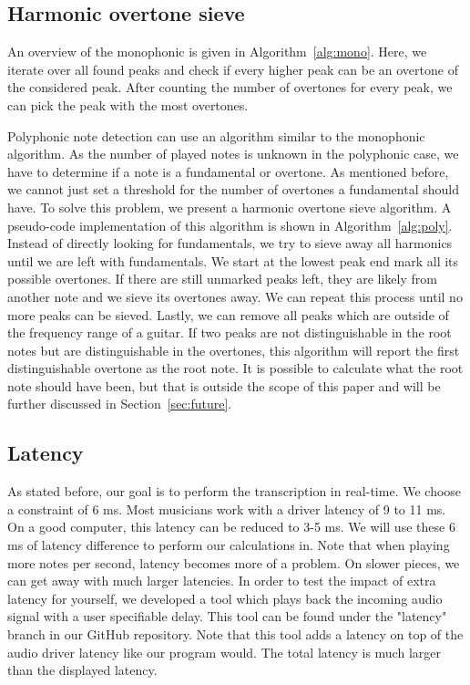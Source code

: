 \documentclass[10pt,twocolumn]{article}
\begin{document}
\subsection{Harmonic overtone sieve}  \label{sub:impnoteset}
An overview of the monophonic is given in Algorithm~\ref{alg:mono}. Here, we iterate over all found peaks and check if every higher peak can be an overtone of the considered peak. After counting the number of overtones for every peak, we can pick the peak with the most overtones.


Polyphonic note detection can use an algorithm similar to the monophonic algorithm. As the number of played notes is unknown in the polyphonic case, we have to determine if a note is a fundamental or overtone. As mentioned before, we cannot just set a threshold for the number of overtones a fundamental should have. To solve this problem, we present a harmonic overtone sieve algorithm. A pseudo-code implementation of this algorithm is shown in Algorithm~\ref{alg:poly}. Instead of directly looking for fundamentals, we try to sieve away all harmonics until we are left with fundamentals. We start at the lowest peak end mark all its possible overtones. If there are still unmarked peaks left, they are likely from another note and we sieve its overtones away. We can repeat this process until no more peaks can be sieved. Lastly, we can remove all peaks which are outside of the frequency range of a guitar. If two peaks are not distinguishable in the root notes but are distinguishable in the overtones, this algorithm will report the first distinguishable overtone as the root note. It is possible to calculate what the root note should have been, but that is outside the scope of this paper and will be further discussed in Section~\ref{sec:future}.


\subsection{Latency}
As stated before, our goal is to perform the transcription in real-time. We choose a constraint of 6 ms. Most musicians work with a driver latency of 9 to 11 ms. On a good computer, this latency can be reduced to 3-5 ms. We will use these 6 ms of latency difference to perform our calculations in. Note that when playing more notes per second, latency becomes more of a problem. On slower pieces, we can get away with much larger latencies. In order to test the impact of extra latency for yourself, we developed a tool which plays back the incoming audio signal with a user specifiable delay. This tool can be found under the "latency" branch in our GitHub repository. Note that this tool adds a latency on top of the audio driver latency like our program would. The total latency is much larger than the displayed latency.
\end{document}
